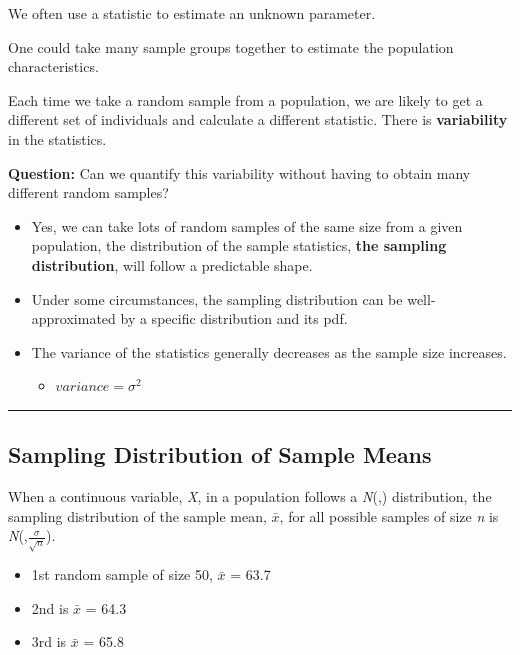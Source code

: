 \documentclass[
  openany]{book}
\providecommand{\tightlist}{%
  \setlength{\itemsep}{0pt}\setlength{\parskip}{0pt}}
\begin{document}
We often use a statistic to estimate an unknown parameter.

One could take many sample groups together to estimate the population characteristics.

Each time we take a random sample from a population, we are likely to get a different set of individuals and calculate a different statistic. There is \textbf{variability} in the statistics.

\textbf{Question:} Can we quantify this variability without having to obtain many different random samples?

\begin{itemize}
\tightlist
\item
  Yes, we can take lots of random samples of the same size from a given population, the distribution of the sample statistics, \textbf{the sampling distribution}, will follow a predictable shape.
\item
  Under some circumstances, the sampling distribution can be well-approximated by a specific distribution and its pdf.
\item
  The variance of the statistics generally decreases as the sample size increases.

  \begin{itemize}
  \tightlist
  \item
    \(variance = \sigma^2\)
  \end{itemize}
\end{itemize}

\begin{center}\rule{0.5\linewidth}{0.5pt}\end{center}

\subsection{Sampling Distribution of Sample Means}\label{sampling-distribution-of-sample-means}

When a continuous variable, \emph{X}, in a population follows a \emph{N}(\mu,\sigma) distribution, the sampling distribution of the sample mean, \(\bar{x}\), for all possible samples of size \emph{n} is \emph{N}(\mu,\(\frac{\sigma}{\sqrt{n}}\)).

\begin{itemize}
\tightlist
\item
  1st random sample of size 50, \(\bar{x}\) = 63.7
\item
  2nd is \(\bar{x}\) = 64.3
\item
  3rd is \(\bar{x}\) = 65.8
\end{itemize}
\end{document}
